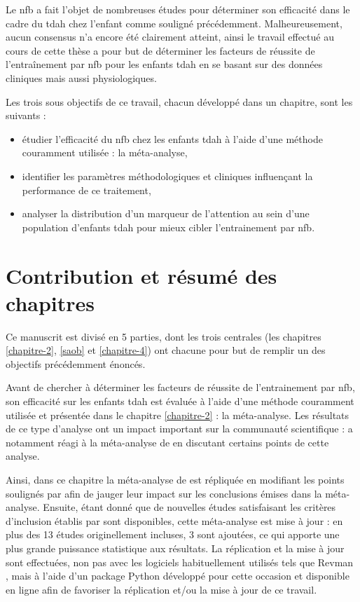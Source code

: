 Le \gls{nfb} a fait l'objet de nombreuses études pour déterminer son efficacité dans le cadre du \gls{tdah} chez l'enfant comme souligné précédemment.
Malheureusement, aucun consensus n'a encore été clairement atteint, ainsi le travail effectué au cours de cette thèse a pour but de déterminer les facteurs 
de réussite de l'entraînement par \gls{nfb} pour les enfants \gls{tdah} en se basant sur des données cliniques mais aussi physiologiques. 

Les trois sous objectifs de ce travail, chacun développé dans un chapitre, sont les suivants :
\renewcommand{\labelitemi}{$\bullet$}
\renewcommand{\labelitemii}{$\cdot$}
\begin{itemize}
\item étudier l'efficacité du \gls{nfb} chez les enfants \gls{tdah} à l'aide d'une méthode couramment utilisée : la méta-analyse,
\item identifier les paramètres méthodologiques et cliniques influençant la performance de ce traitement,
\item analyser la distribution d'un marqueur de l'attention au sein d'une population d'enfants \gls{tdah} pour mieux cibler
l'entrainement par \gls{nfb}. 
\end{itemize}

\section{Contribution et résumé des chapitres}

Ce manuscrit est divisé en 5 parties, dont les trois centrales (les chapitres \ref{chapitre-2}, \ref{saob} et \ref{chapitre-4}) ont chacune pour but de remplir 
un des objectifs précédemment énoncés.

Avant de chercher à déterminer les facteurs de réussite de l'entrainement par \gls{nfb}, son efficacité sur les enfants \gls{tdah} est évaluée à l'aide 
d'une méthode couramment utilisée \citep{Sonuga-Barke2013, Micoulaud2014, Cortese2016} et présentée dans le chapitre \ref{chapitre-2} : la méta-analyse. 
Les résultats de ce type d'analyse ont un impact important sur la communauté scientifique : \citet{Micoulaud2016} a notamment réagi à la méta-analyse de 
\citet{Cortese2016} en discutant certains points de cette analyse. 

Ainsi, dans ce chapitre la méta-analyse de \citet{Cortese2016} est répliquée en modifiant les points soulignés par \citet{Micoulaud2016}
afin de jauger leur impact sur les conclusions émises dans la méta-analyse. Ensuite, étant donné que de nouvelles études satisfaisant les critères d'inclusion
établis par \citet{Cortese2016} sont disponibles, cette méta-analyse est mise à jour : en plus des 13 études originellement incluses, 3
sont ajoutées, ce qui apporte une plus grande puissance statistique aux résultats. La réplication et la mise à jour sont effectuées, non pas avec les logiciels 
habituellement utilisés tels que Revman \citep{Revman}, mais à l'aide d'un package Python développé pour cette occasion et disponible en ligne afin de favoriser 
la réplication et/ou la mise à jour de ce travail. 

